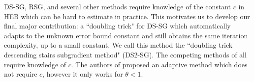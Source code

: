 \documentclass[smallextended]{svjour3}
\begin{document}
DS-SG, RSG, and several other methods \cite{goffin1977convergence,shor2012minimization} require knowledge of the constant $c$ in HEB which can be hard to estimate in practice. This motivates us to develop our final major contribution: a ``doubling trick" for DS-SG which automatically adapts to the unknown error bound constant and still obtains the same iteration complexity, up to a small constant. We call this method  the ``doubling trick descending stairs subgradient method" (DS2-SG).  The competing methods of \cite{yang2015rsg,supittayapornpong2016staggered,shor2012minimization,goffin1977convergence} all require knowledge of $c$. The authors of \cite{yang2015rsg} proposed an adaptive method which does not require $c$, however it only works for $\theta<1$. %
 
\end{document}
